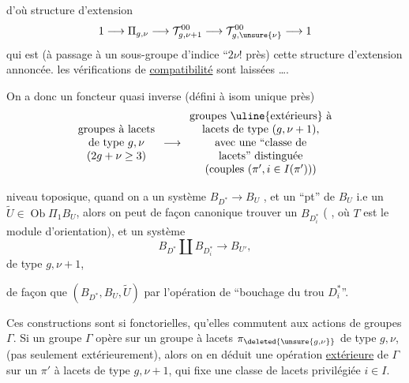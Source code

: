 d'où  structure d'extension 
\[
1\longrightarrow\Pi_{g,\nu}
\longrightarrow\mathcal T^{00}_{g,\nu+1}
\longrightarrow\mathcal T^{00}_{g,\unsure{\nu}}
\longrightarrow1
\]
qui est (à passage à un sous-groupe d'indice ``\(2\nu!\) près) cette structure d'extension annoncée. \unsure{\&} les vérifications de \uline{compatibilité} sont laissées \ldots.

On a donc un foncteur quasi inverse (défini à isom unique près)
\[
\begin{array}{c}
\text{groupes à lacets}\\
\text{de type }g,\nu\\
(2g+\nu\ge3)
\end{array}
\longrightarrow
\begin{array}{c}
\text{groupes \uline{extérieurs} à}\\
\text{lacets de type }(g,\nu+1),\\
\text{avec une ``classe de}\\
\text{lacets'' distinguée}\\
\text{(couples }(\pi',i\in I(\pi'))\text{)}
\end{array}
\]

  niveau toposique, quand on a un système \(B_{D^*}\longrightarrow B_U\) , et un ``pt'' de \(B_U\) i.e un \(\widetilde U\in\operatorname{Ob}\Pi_1B_U\), alors on peut de façon canonique trouver un \(B_{D_i^*}\) ( , où \(T\) est le module d'orientation), et un système
\[
B_{D^*}\amalg B_{D_i^*}\longrightarrow B_{U'},
\]
de type \(g,\nu+1\),

de façon que \((B_{D^*},B_U,\widetilde U)\)  par l'opération de ``bouchage du trou \(D_i^*\)''.

Ces constructions sont si fonctorielles, \margin{\unsure{\(\wedge\)}} qu'elles commutent aux actions de groupes \(\Gamma\). Si un groupe \(\Gamma\) opère sur un groupe à lacets \(\pi_{\deleted{\unsure{g,\nu}}}\) de type \(g,\nu\), (pas seulement extérieurement), alors on en déduit une opération \uline{extérieure} de \(\Gamma\) sur un \(\pi'\) à lacets de type \(g,\nu+1\), qui fixe une classe de lacets privilégiée \(i\in I\).

